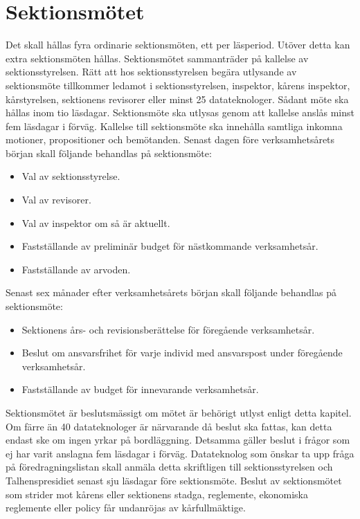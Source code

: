 \documentclass[a4paper]{dteklag}
\begin{document}
\section{Sektionsmötet}
\para[Sammanträden] Det skall hållas fyra ordinarie sektionsmöten, ett per läsperiod. Utöver detta kan extra sektionsmöten hållas.
\para Sektionsmötet sammanträder på kallelse av sektionsstyrelsen.
\para Rätt att hos sektionsstyrelsen begära utlysande av sektionsmöte tillkommer ledamot i sektionsstyrelsen, inspektor, kårens inspektor, kårstyrelsen, sektionens revisorer eller minst 25 datateknologer. Sådant möte ska hållas inom tio läsdagar.
\para Sektionsmöte ska utlysas genom att kallelse anslås minst fem läsdagar i förväg.
\para Kallelse till sektionsmöte ska innehålla samtliga inkomna motioner, propositioner och bemötanden.
\para[Åligganden] Senast dagen före verksamhetsårets början skall följande behandlas på sektionsmöte:
\begin{itemize}
\item Val av sektionsstyrelse.
\item Val av revisorer.
\item Val av inspektor om så är aktuellt.
\item Fastställande av preliminär budget för nästkommande verksamhetsår.
\item Fastställande av arvoden.
\end{itemize}
\para Senast sex månader efter verksamhetsårets början skall följande behandlas på sektionsmöte:
\begin{itemize}
\item Sektionens års- och revisionsberättelse för föregående verksamhetsår.
\item Beslut om ansvarsfrihet för varje individ med ansvarspost under föregående verksamhetsår.
\item Fastställande av budget för innevarande verksamhetsår.
\end{itemize}
\para[Beslutförhet] Sektionsmötet är beslutsmässigt om mötet är behörigt utlyst enligt detta kapitel.
\stycke
Om färre än 40 datateknologer är närvarande då beslut ska fattas, kan detta endast ske om ingen yrkar på bordläggning.
\stycke Detsamma gäller beslut i frågor som ej har varit anslagna fem läsdagar i förväg.
\para[Motion] Datateknolog som önskar ta upp fråga på föredragningslistan skall anmäla detta skriftligen till sektionsstyrelsen och Talhenspresidiet senast sju läsdagar före sektionsmöte.
\para[Överklagande] Beslut av sektionsmötet som strider mot kårens eller sektionens stadga, reglemente, ekonomiska reglemente eller policy får undanröjas av kårfullmäktige.
\end{document}
